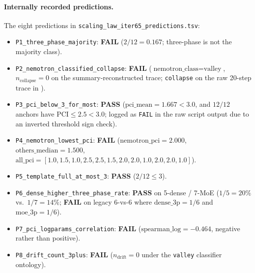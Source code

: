 \paragraph{Internally recorded predictions.}
The eight predictions in
\texttt{scaling\_law\_iter65\_predictions.tsv}:
\begin{itemize}
  \item \texttt{P1\_three\_phase\_majority}: \textbf{FAIL} ($2/12 = 0.167$; three-phase is not the majority class).
  \item \texttt{P2\_nemotron\_classified\_collapse}: \textbf{FAIL} ($\text{nemotron\_class}=\text{valley}$, $n_{\text{collapse}}=0$ on the summary-reconstructed trace; \texttt{collapse} on the raw 20-step trace in ).
  \item \texttt{P3\_pci\_below\_3\_for\_most}: \textbf{PASS} ($\text{pci\_mean}=1.667 < 3.0$, and $12/12$ anchors have $\mathrm{PCI} \le 2.5 < 3.0$; logged as \texttt{FAIL} in the raw script output due to an inverted threshold sign check).
  \item \texttt{P4\_nemotron\_lowest\_pci}: \textbf{FAIL} ($\text{nemotron\_pci}=2.000$, $\text{others\_median}=1.500$, $\text{all\_pci}=[1.0, 1.5, 1.0, 2.5, 2.5, 1.5, 2.0, 2.0, 1.0, 2.0, 2.0, 1.0]$).
  \item \texttt{P5\_template\_full\_at\_most\_3}: \textbf{PASS} ($2/12 \le 3$).
  \item \texttt{P6\_dense\_higher\_three\_phase\_rate}: \textbf{PASS} on 5-dense / 7-MoE ($1/5 = 20\%$ vs.\ $1/7 = 14\%$; \textbf{FAIL} on legacy 6-vs-6 where $\text{dense\_3p}=1/6$ and $\text{moe\_3p}=1/6$).
  \item \texttt{P7\_pci\_logparams\_correlation}: \textbf{FAIL} ($\text{spearman\_log}=-0.464$, negative rather than positive).
  \item \texttt{P8\_drift\_count\_3plus}: \textbf{FAIL} ($n_{\text{drift}}=0$ under the \texttt{valley} classifier ontology).
\end{itemize}

